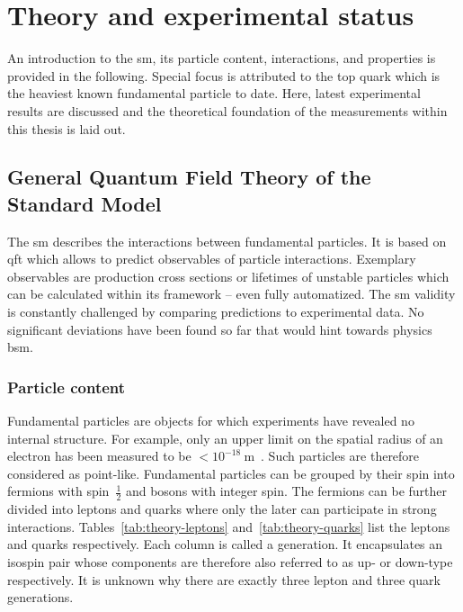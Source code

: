 \chapter{Theory and experimental status}

An introduction to the \gls{sm}, its particle content, interactions, and properties is provided in the following. Special focus is attributed to the top quark which is the heaviest known fundamental particle to date. Here, latest experimental results are discussed and the theoretical foundation of the measurements within this thesis is laid out.


\section{General Quantum Field Theory of the Standard Model}

The \gls{sm} describes the interactions between fundamental particles. It is based on \gls{qft} which allows to predict observables of particle interactions. Exemplary observables are production cross sections or lifetimes of unstable particles which can be calculated within its framework -- even fully automatized. The \gls{sm} validity is constantly challenged by comparing predictions to experimental data. No significant deviations have been found so far that would hint towards physics \gls{bsm}.


\subsection{Particle content}

Fundamental particles are objects for which experiments have revealed no internal structure. For example, only an upper limit on the spatial radius of an electron has been measured to be $<10^{-18}~\mathrm{m}$~\cite{PhysRevLett.97.030801}. Such particles are therefore considered as point-like. Fundamental particles can be grouped by their spin into fermions with spin~$\frac{1}{2}$ and bosons with integer spin. The fermions can be further divided into leptons and quarks where only the later can participate in strong interactions. Tables~\ref{tab:theory-leptons} and~\ref{tab:theory-quarks} list the leptons and quarks respectively. Each column is called a generation. It encapsulates an isospin pair whose components are therefore also referred to as up- or down-type respectively. It is unknown why there are exactly three lepton and three quark generations.

